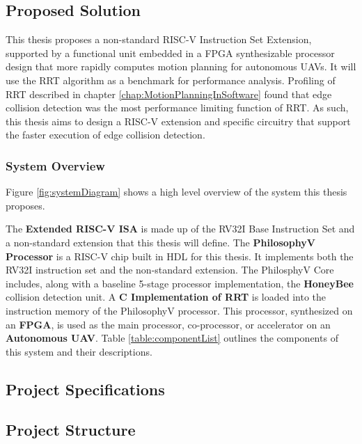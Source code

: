 
\subsection{Proposed Solution}
    This thesis proposes a non-standard RISC-V Instruction Set Extension, supported by a functional unit embedded in a \ac{FPGA} synthesizable processor design that more rapidly computes motion planning for autonomous \ac{UAV}s. It will use the \ac{RRT} algorithm as a benchmark for performance analysis. Profiling of \ac{RRT} described in chapter \ref{chap:MotionPlanningInSoftware} found that edge collision detection was the most performance limiting function of \ac{RRT}. As such, this thesis aims to design a RISC-V extension and specific circuitry that support the faster execution of edge collision detection.

    \subsubsection*{System Overview}
        Figure \ref{fig:systemDiagram} shows a high level overview of the system this thesis proposes.
        
        The \textbf{Extended RISC-V \ac{ISA}} is made up of the \ac{RV32I} Base Instruction Set and a  non-standard extension that this thesis will define.
        The \textbf{PhilosophyV Processor} is a RISC-V chip built in \ac{HDL} for this thesis. It implements both the \ac{RV32I} instruction set and the non-standard extension.
        The PhilosphyV Core includes, along with a baseline 5-stage processor implementation, the \textbf{HoneyBee} collision detection unit.
        A \textbf{C Implementation of RRT} is loaded into the instruction memory of the PhilosophyV processor. This processor, synthesized on an \textbf{\ac{FPGA}}, is used as the main processor, co-processor, or accelerator on an \textbf{Autonomous \ac{UAV}}. Table \ref{table:componentList} outlines the components of this system and their descriptions.
        

\subsection{Project Specifications}


\subsection{Project Structure}
\label{subsection:project_structure}
